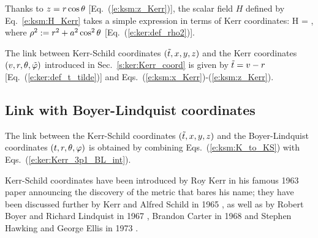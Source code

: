 Thanks to $z=r\cos\theta$ [Eq.~(\ref{e:ksm:z_Kerr})], the scalar field $H$
defined by Eq.~\eqref{e:ksm:H_Kerr} takes a simple expression in terms of
Kerr coordinates:
\be
    H =  ,
\ee
where $\rho^2 := r^2 + a^2 \cos^2\theta$ [Eq.~(\ref{e:ker:def_rho2})].

The link between Kerr-Schild coordinates $({\tilde t}, x, y, z)$ and the Kerr
coordinates $(v, r, \theta, {\tilde\varphi})$ introduced in Sec.~\ref{s:ker:Kerr_coord}
is given by ${\tilde t} = v - r$ [Eq.~(\ref{e:ker:def_t_tilde})]
and
Eqs.~(\ref{e:ksm:x_Kerr})-(\ref{e:ksm:z_Kerr}).


\subsection{Link with Boyer-Lindquist coordinates}

The link between the Kerr-Schild coordinates $({\tilde t},x,y,z)$ and the Boyer-Lindquist
coordinates $(t,r,\theta,\varphi)$
is obtained by combining Eqs.~(\ref{e:ksm:K_to_KS}) with Eqs.~(\ref{e:ker:Kerr_3p1_BL_int}).


\begin{hist}
Kerr-Schild coordinates have been introduced by Roy Kerr in his famous 1963 paper
\cite{Kerr63} announcing the discovery of the
metric that bares his name; they have been discussed further by Kerr and Alfred
Schild
in 1965 \cite{KerrS65}, as well as by
Robert Boyer and Richard Lindquist
in 1967 \cite{BoyerL67}, Brandon Carter in 1968
\cite{Carte68}
and Stephen Hawking and George Ellis in 1973 \cite{HawkiE73}.
\end{hist}
